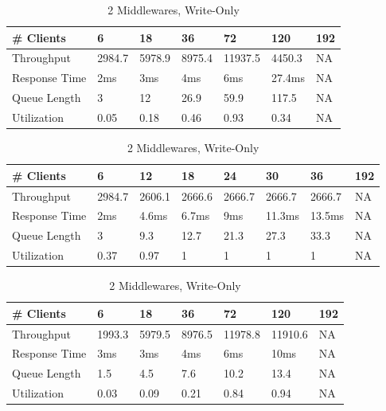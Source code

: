 \documentclass[11pt,a4paper]{article}
\begin{document}
\begin{table}
    \begin{subtable}{1.0\linewidth}\centering
        \begin{tabular}{lllllll}
        \hline
        \# Clients & 6  & 18 & 36 & 72 & 120 & 192\\
        \hline
        Throughput & 2984.7 & 5978.9 & 8975.4 & 11937.5 & 4450.3 & NA\\
        Response Time & 2ms & 3ms & 4ms & 6ms & 27.4ms & NA\\
        Queue Length & 3 & 12 & 26.9 & 59.9 & 117.5 & NA\\
        Utilization & 0.05 & 0.18 & 0.46 & 0.93 & 0.34 & NA\\
        \hline
        \end{tabular}
    \caption{1 Middleware, Write-Only}
    \end{subtable}
    
    \begin{subtable}{1.0\linewidth}\centering
        \begin{tabular}{llllllll}
        \hline
        \# Clients & 6 & 12 & 18 & 24 & 30 & 36 & 192\\
        \hline
        Throughput & 2984.7 & 2606.1 & 2666.6 & 2666.7 & 2666.7 & 2666.7 & NA\\
        Response Time & 2ms & 4.6ms & 6.7ms & 9ms & 11.3ms & 13.5ms & NA\\
        Queue Length & 3 & 9.3 & 12.7 & 21.3 & 27.3 & 33.3 & NA\\
        Utilization & 0.37 & 0.97 & 1 & 1 & 1 & 1 & NA\\
        \hline
        \end{tabular}
    \caption{1 Middleware, Read-Only}
    \end{subtable}
    
    \begin{subtable}{1.0\linewidth}\centering
        \begin{tabular}{lllllll}
        \hline
        \# Clients & 6 & 18 & 36 & 72 & 120 & 192\\
        \hline
        Throughput & 1993.3 & 5979.5 & 8976.5 & 11978.8 & 11910.6 & NA\\
        Response Time & 3ms & 3ms & 4ms & 6ms & 10ms & NA\\
        Queue Length & 1.5 & 4.5 & 7.6 & 10.2 & 13.4 & NA\\
        Utilization & 0.03 & 0.09 & 0.21 & 0.84 & 0.94 & NA\\
        \hline
        \end{tabular}
    \caption{2 Middlewares, Write-Only}
    \end{subtable}
    

\end{table}
\end{document}
